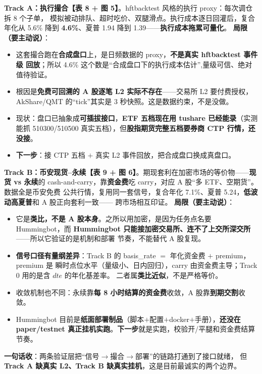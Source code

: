 \documentclass[11pt]{ctexart}
\newcommand{\cue}[1]{{\color{cue}\textbf{【#1】}}}
\begin{document}
\textbf{Track A：执行撮合}\cue{表 8 + 图 5}。hftbacktest 风格的执行 proxy：每次调仓拆 8 个子单，
模拟被动排队、超时吃价、双腿滑点。执行成本逐日回灌后，复合年化从 5.6\% 降到 \textbf{4.6\%}、夏普
1.94 降到 1.39——\textbf{执行成本拖累可量化}。
\textbf{局限（要主动说）}：
\begin{itemize}
  \item 这套撮合跑在\textbf{合成盘口}上，是日频数据的 proxy，\textbf{不是真实 hftbacktest 事件级
        回放}；所以 4.6\% 这个数是``合成盘口下的执行成本估计'',量级可信、绝对值待验证。
  \item 根因是\textbf{免费可回溯的 A 股逐笔 L2 实际不存在}——交易所 L2 要付费授权，
        AkShare/QMT 的``tick''其实是 3 秒快照。这是数据约束，不是没做。
  \item 现状：盘口已抽象成\textbf{可插拔接口}，\textbf{ETF 五档现在用 tushare 已经能录}（实测能抓
        510300/510500 真实五档），但\textbf{股指期货完整五档要券商 CTP 行情，还没接}。
  \item \textbf{下一步}：接 CTP 五档 $+$ 真实 L2 事件回放，把合成盘口换成真盘口。
\end{itemize}

\textbf{Track B：币安现货--永续}\cue{表 9 + 图 6}。期现套利在加密市场的等价物——\textbf{现货 vs
永续}的 cash-and-carry，靠\textbf{资金费}吃 carry，对应 A 股``多 ETF、空期货''。数据全是币安免费
公共行情，复用同一套信号，复合年化 7.1\%、夏普 5.24，\textbf{低波动高夏普}和 A 股正向套利一致——
跨市场相互印证。
\textbf{局限（要主动说）}：
\begin{itemize}
  \item 它是\textbf{类比，不是 A 股本身}。之所以用加密，是因为任务点名要 Hummingbot，而
        \textbf{Hummingbot 只能接加密交易所、连不了上交所深交所}——所以它验证的是机制和部署
        节奏，不能替代 A 股复现。
  \item \textbf{信号口径有量纲差异}：Track B 的 basis\_rate $=$ 年化资金费 $+$ premium，premium 是
        瞬时点位水平（量级小、日内回归），carry 由资金费主导；Track 0 用的是含 $dte$ 的年化基差率。
        二者属\textbf{类比近似}，不是严格等价。
  \item 收敛机制也不同：永续靠\textbf{每 8 小时结算的资金费}收敛，A 股靠\textbf{到期交割}收敛。
  \item Hummingbot 目前是\textbf{纸面部署制品}（脚本$+$配置$+$docker$+$手册），\textbf{还没在
        paper/testnet 真正挂机实跑}。\textbf{下一步}就是实跑，校验开/平腿和资金费结算节奏。
\end{itemize}

\noindent\textbf{一句话收}：两条验证层把``信号$\to$撮合$\to$部署''的链路打通到了接口就绪，
但\textbf{Track A 缺真实 L2、Track B 缺真实挂机}，这是目前最诚实的两个边界。
\end{document}
